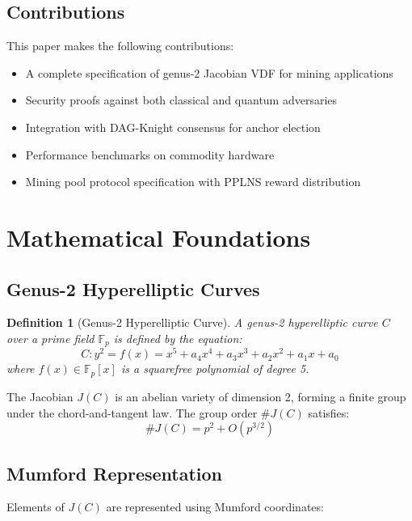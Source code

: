 \documentclass[11pt,a4paper]{article}
\newtheorem{definition}{Definition}
\begin{document}
\subsection{Contributions}

This paper makes the following contributions:

\begin{itemize}
    \item A complete specification of genus-2 Jacobian VDF for mining applications
    \item Security proofs against both classical and quantum adversaries
    \item Integration with DAG-Knight consensus for anchor election
    \item Performance benchmarks on commodity hardware
    \item Mining pool protocol specification with PPLNS reward distribution
\end{itemize}

\section{Mathematical Foundations}

\subsection{Genus-2 Hyperelliptic Curves}

\begin{definition}[Genus-2 Hyperelliptic Curve]
A genus-2 hyperelliptic curve $C$ over a prime field $\mathbb{F}_p$ is defined by the equation:
\begin{equation}
C: y^2 = f(x) = x^5 + a_4x^4 + a_3x^3 + a_2x^2 + a_1x + a_0
\end{equation}
where $f(x) \in \mathbb{F}_p[x]$ is a squarefree polynomial of degree 5.
\end{definition}

The Jacobian $J(C)$ is an abelian variety of dimension 2, forming a finite group under the chord-and-tangent law. The group order $\#J(C)$ satisfies:
\begin{equation}
\#J(C) = p^2 + O(p^{3/2})
\end{equation}

\subsection{Mumford Representation}

Elements of $J(C)$ are represented using Mumford coordinates:
\end{document}
